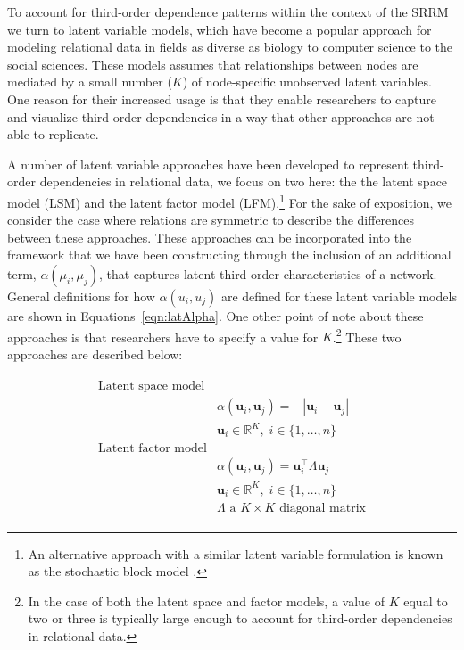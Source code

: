 \documentclass[12pt,pdflatex]{elsarticle}
\begin{document}
To account for third-order dependence patterns within the context of the SRRM we turn to latent variable models, which have become a popular approach for modeling relational data in fields as diverse as biology to computer science to the social sciences. These models assumes that relationships between nodes are mediated by a small number ($K$) of node-specific unobserved latent variables. One reason for their increased usage is that they enable researchers to capture and visualize third-order dependencies in a way that other approaches are not able to replicate.

A number of latent variable approaches have been developed to represent third-order dependencies in relational data, we focus on two here: the the latent space model (LSM) and the latent factor model (LFM).\footnote{An alternative approach with a similar latent variable formulation is known as the stochastic block model \citep{nowicki:snijders:2001}. } For the sake of exposition, we consider the case where relations are symmetric to describe the differences between these approaches. These approaches can be incorporated into the framework that we have been constructing through the inclusion of an additional term, $\alpha(\mu_{i}, \mu_{j})$, that captures latent third order characteristics of a network. General definitions for how $\alpha(u_{i}, u_{j})$ are defined for these latent variable models are shown in Equations~\ref{eqn:latAlpha}. One other point of note about these approaches is that researchers have to specify a value for $K$.\footnote{In the case of both the latent space and factor models, a value of $K$ equal to two or three is typically large enough to account for third-order dependencies in relational data.} These two approaches are described below:


\begin{align}
\begin{aligned}
\text{Latent space model} \\
	&\alpha(\textbf{u}_{i}, \textbf{u}_{j}) = -|\textbf{u}_{i} - \textbf{u}_{j}| \\
	&\textbf{u}_{i} \in \mathbb{R}^{K}, \; i \in \{1, \ldots, n \} \\
\text{Latent factor model} \\
	&\alpha(\textbf{u}_{i}, \textbf{u}_{j}) = \textbf{u}_{i}^{\top} \Lambda \textbf{u}_{j} \\
	&\textbf{u}_{i} \in \mathbb{R}^{K}, \; i \in \{1, \ldots, n \} \\
	&\Lambda \text{ a } K \times K \text{ diagonal matrix}
\label{eqn:latAlpha}
\end{aligned}
\end{align}
\end{document}
